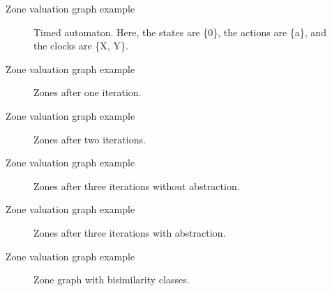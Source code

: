 \documentclass{beamer}
\begin{document}
\begin{frame}{Zone valuation graph example}
  \begin{figure}
    \centering
    \def\svgwidth{0.6\columnwidth}
    
    \caption{Timed automaton. Here, the states are \{0\}, the actions
      are \{a\}, and the clocks are \{X, Y\}.}
  \end{figure}
\end{frame}

\begin{frame}{Zone valuation graph example}
  \begin{figure}
    \centering
    \def\svgwidth{0.4\columnwidth}
    
    \caption{Zones after one iteration.}
  \end{figure}
\end{frame}

\begin{frame}[shrink=20]{Zone valuation graph example}
  \begin{figure}
    \centering
    \def\svgwidth{0.7\columnwidth}
    
    \caption{Zones after two iterations.}
  \end{figure}
\end{frame}

\begin{frame}[shrink=20]{Zone valuation graph example}
  \begin{figure}
    \centering
    \def\svgwidth{0.9\columnwidth}
    
    \caption{Zones after three iterations without abstraction.}
  \end{figure}
\end{frame}

\begin{frame}[shrink=20]{Zone valuation graph example}
  \begin{figure}
    \centering
    \def\svgwidth{1.2\columnwidth}
    
    \caption{Zones after three iterations with abstraction.}
  \end{figure}
\end{frame}

\begin{frame}[shrink=60]{Zone valuation graph example}
  \begin{figure}
    \centering
    \def\svgwidth{2.7\columnwidth}
    
    \caption{Zone graph with bisimilarity classes.}
  \end{figure}
\end{frame}
\end{document}
